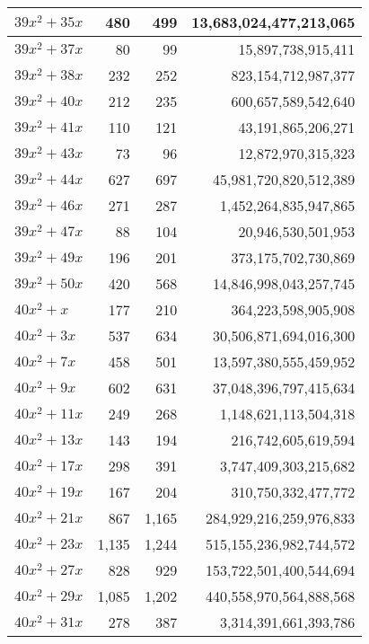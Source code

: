 \documentclass[a4paper]{amsproc}
\theoremstyle{plain}
\theoremstyle{named}
\begin{document}
\begin{longtable}{ | l | r | r | r | }
$39x^2 + 35x$ & 480 & 499 & 13{,}683{,}024{,}477{,}213{,}065 \\ \hline
$39x^2 + 37x$ & 80 & 99 & 15{,}897{,}738{,}915{,}411 \\ \hline
$39x^2 + 38x$ & 232 & 252 & 823{,}154{,}712{,}987{,}377 \\ \hline
$39x^2 + 40x$ & 212 & 235 & 600{,}657{,}589{,}542{,}640 \\ \hline
$39x^2 + 41x$ & 110 & 121 & 43{,}191{,}865{,}206{,}271 \\ \hline
$39x^2 + 43x$ & 73 & 96 & 12{,}872{,}970{,}315{,}323 \\ \hline
$39x^2 + 44x$ & 627 & 697 & 45{,}981{,}720{,}820{,}512{,}389 \\ \hline
$39x^2 + 46x$ & 271 & 287 & 1{,}452{,}264{,}835{,}947{,}865 \\ \hline
$39x^2 + 47x$ & 88 & 104 & 20{,}946{,}530{,}501{,}953 \\ \hline
$39x^2 + 49x$ & 196 & 201 & 373{,}175{,}702{,}730{,}869 \\ \hline
$39x^2 + 50x$ & 420 & 568 & 14{,}846{,}998{,}043{,}257{,}745 \\ \hline
$40x^2 + x$ & 177 & 210 & 364{,}223{,}598{,}905{,}908 \\ \hline
$40x^2 + 3x$ & 537 & 634 & 30{,}506{,}871{,}694{,}016{,}300 \\ \hline
$40x^2 + 7x$ & 458 & 501 & 13{,}597{,}380{,}555{,}459{,}952 \\ \hline
$40x^2 + 9x$ & 602 & 631 & 37{,}048{,}396{,}797{,}415{,}634 \\ \hline
$40x^2 + 11x$ & 249 & 268 & 1{,}148{,}621{,}113{,}504{,}318 \\ \hline
$40x^2 + 13x$ & 143 & 194 & 216{,}742{,}605{,}619{,}594 \\ \hline
$40x^2 + 17x$ & 298 & 391 & 3{,}747{,}409{,}303{,}215{,}682 \\ \hline
$40x^2 + 19x$ & 167 & 204 & 310{,}750{,}332{,}477{,}772 \\ \hline
$40x^2 + 21x$ & 867 & 1{,}165 & 284{,}929{,}216{,}259{,}976{,}833 \\ \hline
$40x^2 + 23x$ & 1{,}135 & 1{,}244 & 515{,}155{,}236{,}982{,}744{,}572 \\ \hline
$40x^2 + 27x$ & 828 & 929 & 153{,}722{,}501{,}400{,}544{,}694 \\ \hline
$40x^2 + 29x$ & 1{,}085 & 1{,}202 & 440{,}558{,}970{,}564{,}888{,}568 \\ \hline
$40x^2 + 31x$ & 278 & 387 & 3{,}314{,}391{,}661{,}393{,}786 \\ \hline

\end{longtable}
\end{document}
